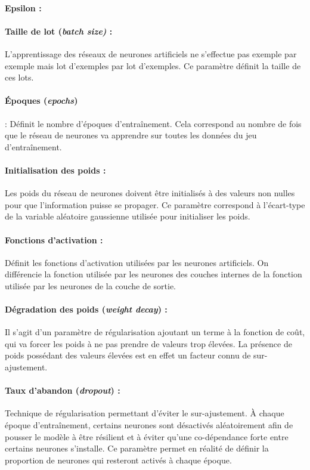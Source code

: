 \paragraph{Epsilon : }

\paragraph{Taille de lot (\emph{batch size)} :} L'apprentissage des réseaux de neurones artificiels ne s'effectue pas exemple par exemple mais lot d'exemples par lot d'exemples. Ce paramètre définit la taille de ces lots.

\paragraph{Époques (\emph{epochs})} : Définit le nombre d'époques d'entraînement. Cela correspond au nombre de fois que le réseau de neurones va apprendre sur toutes les données du jeu d'entraînement.

\paragraph{Initialisation des poids : } Les poids du réseau de neurones doivent être initialisés à des valeurs non nulles pour que l'information puisse se propager. Ce paramètre correspond à l'écart-type de la variable aléatoire gaussienne utilisée pour initialiser les poids.

\paragraph{Fonctions d'activation : } Définit les fonctions d'activation utilisées par les neurones artificiels. On différencie la fonction utilisée par les neurones des couches internes de la fonction utilisée par les neurones de la couche de sortie.

\paragraph{Dégradation des poids (\emph{weight decay}) : } Il s'agit d'un paramètre de régularisation ajoutant un terme à la fonction de coût, qui va forcer les poids à ne pas prendre de valeurs trop élevées. La présence de poids possédant des valeurs élevées est en effet un facteur connu de sur-ajustement.

\paragraph{Taux d'abandon (\emph{dropout}) : } Technique de régularisation permettant d'éviter le sur-ajustement. À chaque époque d'entraînement, certains neurones sont désactivés aléatoirement afin de pousser le modèle à être résilient et à éviter qu'une co-dépendance forte entre certains neurones s'installe. Ce paramètre permet en réalité de définir la proportion de neurones qui resteront activés à chaque époque.



